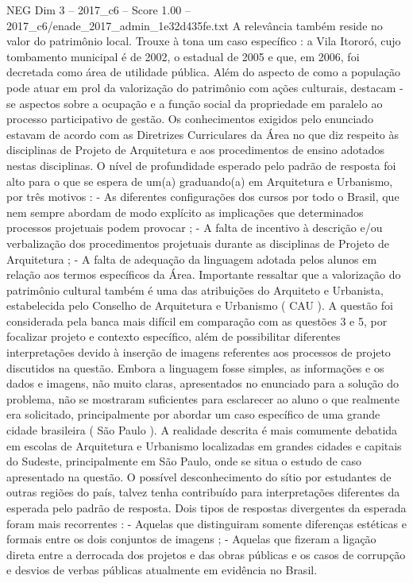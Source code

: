 \begin{textsample}{NEG Dim 3 – 2017\_c6 – Score 1.00 – 2017\_c6/enade\_2017\_admin\_1e32d435fe.txt}
A relevância também reside no valor do patrimônio local.
Trouxe à tona um caso específico : a Vila Itororó, cujo tombamento municipal é de 2002, o estadual de 2005 e que, em 2006, foi decretada como área de utilidade pública.
Além do aspecto de como a população pode atuar em prol da valorização do patrimônio com ações culturais, destacam -se aspectos sobre a ocupação e a função social da propriedade em paralelo ao processo participativo de gestão.
Os conhecimentos exigidos pelo enunciado estavam de acordo com as Diretrizes Curriculares da Área no que diz respeito às disciplinas de Projeto de Arquitetura e aos procedimentos de ensino adotados nestas disciplinas.
O nível de profundidade esperado pelo padrão de resposta foi alto para o que se espera de um(a) graduando(a) em Arquitetura e Urbanismo, por três motivos : - As diferentes configurações dos cursos por todo o Brasil, que nem sempre abordam de modo explícito as implicações que determinados processos projetuais podem provocar ; - A falta de incentivo à descrição e/ou verbalização dos procedimentos projetuais durante as disciplinas de Projeto de Arquitetura ; - A falta de adequação da linguagem adotada pelos alunos em relação aos termos específicos da Área.
Importante ressaltar que a valorização do patrimônio cultural também é uma das atribuições do Arquiteto e Urbanista, estabelecida pelo Conselho de Arquitetura e Urbanismo ( CAU ).
A questão foi considerada pela banca mais difícil em comparação com as questões 3 e 5, por focalizar projeto e contexto específico, além de possibilitar diferentes interpretações devido à inserção de imagens referentes aos processos de projeto discutidos na questão.
Embora a linguagem fosse simples, as informações e os dados e imagens, não muito claras, apresentados no enunciado para a solução do problema, não se mostraram suficientes para esclarecer ao aluno o que realmente era solicitado, principalmente por abordar um caso específico de uma grande cidade brasileira ( São Paulo ).
A realidade descrita é mais comumente debatida em escolas de Arquitetura e Urbanismo localizadas em grandes cidades e capitais do Sudeste, principalmente em São Paulo, onde se situa o estudo de caso apresentado na questão.
O possível desconhecimento do sítio por estudantes de outras regiões do país, talvez tenha contribuído para interpretações diferentes da esperada pelo padrão de resposta.
Dois tipos de respostas divergentes da esperada foram mais recorrentes : - Aquelas que distinguiram somente diferenças estéticas e formais entre os dois conjuntos de imagens ; - Aquelas que fizeram a ligação direta entre a derrocada dos projetos e das obras públicas e os casos de corrupção e desvios de verbas públicas atualmente em evidência no Brasil.

\end{textsample}
